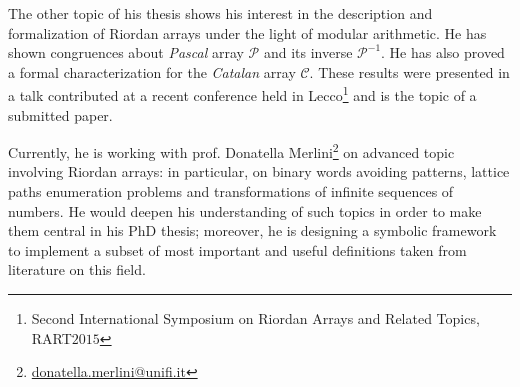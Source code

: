 \documentclass[10pt,a4paper]{scrartcl}
\begin{document}
    The other topic of his thesis shows his interest in the description and formalization of Riordan
    arrays under the light of modular arithmetic. He has shown congruences
    about \emph{Pascal} array $\mathcal{P}$ and its inverse $\mathcal{P}^{-1}$. He
    has also proved a formal characterization for the \emph{Catalan} array
    $\mathcal{C}$. These results were presented in a talk contributed at a recent
    conference held in Lecco\footnote{Second International Symposium on Riordan
    Arrays and Related Topics, RART$2015$} and is the topic of a submitted paper.

    Currently, he is working with prof. Donatella Merlini\footnote{\url{donatella.merlini@unifi.it}}
    on advanced topic involving Riordan arrays: in particular, on binary words avoiding patterns, 
    lattice paths enumeration problems and transformations of infinite sequences of numbers.
    He would deepen his understanding of such topics in order to make them central in his PhD thesis;
    moreover, he is designing a symbolic framework to implement a subset of most important and useful
    definitions taken from literature on this field.
    
    \iffalse %

    \section{Working activity}

    During his studies he worked in middle-size software houses developing mainly client-server
    applications using industrial-strength languages such as Java and C\#, for about eight years.
    \fi
        
    
\end{document}

